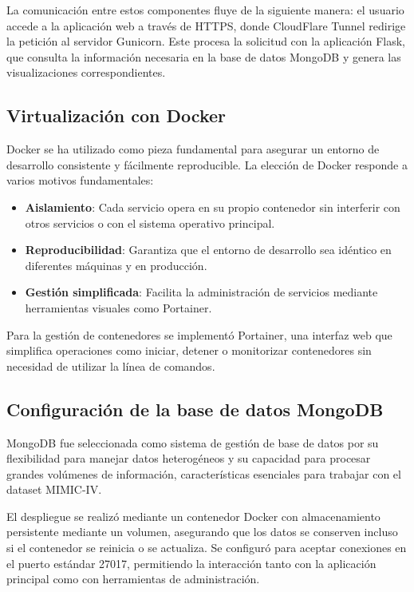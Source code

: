 La comunicación entre estos componentes fluye de la siguiente manera: el usuario accede a la aplicación web a través de HTTPS, donde CloudFlare Tunnel redirige la petición al servidor Gunicorn. Este procesa la solicitud con la aplicación Flask, que consulta la información necesaria en la base de datos MongoDB y genera las visualizaciones correspondientes.

\subsection{Virtualización con Docker}

Docker se ha utilizado como pieza fundamental para asegurar un entorno de desarrollo consistente y fácilmente reproducible. La elección de Docker responde a varios motivos fundamentales:

\begin{itemize}
    \item \textbf{Aislamiento}: Cada servicio opera en su propio contenedor sin interferir con otros servicios o con el sistema operativo principal.
    
    \item \textbf{Reproducibilidad}: Garantiza que el entorno de desarrollo sea idéntico en diferentes máquinas y en producción.
    
    \item \textbf{Gestión simplificada}: Facilita la administración de servicios mediante herramientas visuales como Portainer.
\end{itemize}

Para la gestión de contenedores se implementó Portainer, una interfaz web que simplifica operaciones como iniciar, detener o monitorizar contenedores sin necesidad de utilizar la línea de comandos.

\subsection{Configuración de la base de datos MongoDB}

MongoDB fue seleccionada como sistema de gestión de base de datos por su flexibilidad para manejar datos heterogéneos y su capacidad para procesar grandes volúmenes de información, características esenciales para trabajar con el dataset MIMIC-IV.

El despliegue se realizó mediante un contenedor Docker con almacenamiento persistente mediante un volumen, asegurando que los datos se conserven incluso si el contenedor se reinicia o se actualiza. Se configuró para aceptar conexiones en el puerto estándar 27017, permitiendo la interacción tanto con la aplicación principal como con herramientas de administración.

